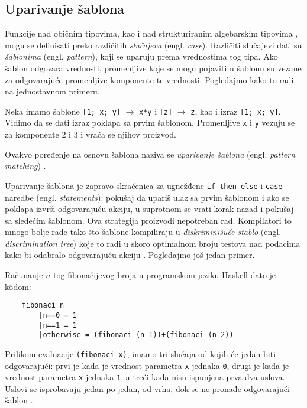 \subsection{Uparivanje šablona}

Funkcije nad običnim tipovima, kao i nad strukturiranim algebarskim tipovima \cite{algebraic-types}, mogu se definisati preko različitih \textit{slučajeva} (engl. \textit{case}). Različiti slučajevi dati su \textit{šablonima} (engl. \textit{pattern}), koji se uparuju prema vrednostima tog tipa. Ako šablon odgovara vrednosti, promenljive koje se mogu pojaviti u šablonu su vezane za odgovarajuće promenljive komponente te vrednosti. Pogledajmo kako to radi na jednostavnom primeru. 

\begin{primer}
	Neka imamo šablone \verb|[1; x; y]| $\longrightarrow$ \verb|x*y| i \verb|[z]| $\longrightarrow$ \verb|z|, kao i izraz \verb|[1; x; y]|. Vidimo da se dati izraz poklapa sa prvim šablonom. Promenljive \verb|x| i \verb|y| vezuju se za komponente 2 i 3 i vraća se njihov proizvod.
\end{primer}

Ovakvo poređenje na osnovu šablona naziva se \textit{uparivanje šablona} (engl. \textit{pattern matching}) \cite{compiler-design}.

Uparivanje šablona je zapravo skraćenica za ugnežđene \verb|if-then-else| i \verb|case| naredbe (engl. \textit{statements}): pokušaj da upariš ulaz sa prvim šablonom i ako se poklapa izvrši odgovarajuću akciju, u suprotnom se vrati korak nazad i pokušaj sa sledećim šablonom. Ova strategija proizvodi nepotreban rad. Kompilatori to mnogo bolje rade tako što šablone kompiliraju u \textit{diskriminišuće stablo} (engl. \textit{discrimination tree}) koje to radi u skoro optimalnom broju testova nad podacima kako bi odabralo odgovarajuću akciju \cite{compiling-fl}. Pogledajmo još jedan primer.

\begin{primer}
	Računanje $n$-tog fibonačijevog broja u programskom jeziku Haskell dato je k\^odom:
	\begin{verbatim}
	fibonaci n
	    |n==0 = 1
	    |n==1 = 1
	    |otherwise = (fibonaci (n-1))+(fibonaci (n-2))
	\end{verbatim}
	Prilikom evaluacije \verb|(fibonaci x)|, imamo tri slučaja od kojih će jedan biti odgovarajući: prvi je kada je vrednost parametra \verb|x| jednaka \verb|0|, drugi je kada je vrednost parametra \verb|x| jednaka \verb|1|, a treći kada nisu ispunjena prva dva uslova. Uslovi se isprobavaju jedan po jedan, od vrha, dok se ne pronađe odgovarajući šablon \cite{the-implementation-of-functional-programming-languages}.
\end{primer}
